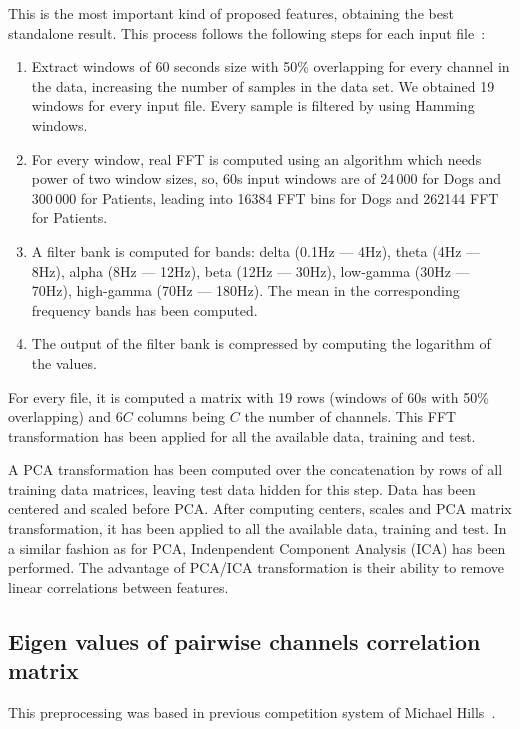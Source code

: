 \documentclass[a4paper,english,twoside]{article}
\begin{document}
This is the most important kind of proposed features, obtaining the best
standalone result. This process follows the following steps for each input
file~\cite{2014:howbert:plosone}:

\begin{enumerate}
\item
  Extract windows of 60 seconds size with 50\% overlapping for every
  channel in the data, increasing the number of samples in the data set.
  We obtained 19 windows for every input file. Every sample is filtered
  by using Hamming windows.
\item
  For every window, real FFT is computed using an algorithm which needs
  power of two window sizes, so, 60s input windows are of 24\,000 for Dogs
  and 300\,000 for Patients, leading into 16384 FFT bins for Dogs and
  262144 FFT for Patients.
\item A filter bank is computed for bands: delta (0.1Hz --- 4Hz), theta (4Hz ---
  8Hz), alpha (8Hz --- 12Hz), beta (12Hz --- 30Hz), low-gamma (30Hz --- 70Hz),
  high-gamma (70Hz --- 180Hz). The mean in the corresponding frequency bands has
  been computed.
\item
  The output of the filter bank is compressed by computing the logarithm
  of the values.
\end{enumerate}

For every file, it is computed a matrix with 19 rows (windows of 60s with 50\%
overlapping) and $6C$ columns being $C$ the number of channels. This FFT
transformation has been applied for all the available data, training and test.

A PCA transformation has been computed over the concatenation by rows of all
training data matrices, leaving test data hidden for this step. Data has been
centered and scaled before PCA. After computing centers, scales and PCA matrix
transformation, it has been applied to all the available data, training and
test. In a similar fashion as for PCA, Indenpendent Component Analysis (ICA) has
been performed. The advantage of PCA/ICA transformation is their ability to
remove linear correlations between features.

\subsection{Eigen values of pairwise channels correlation
  matrix}\label{eigen-values-of-pairwise-channels-correlation-matrix}

This preprocessing was based in previous competition system of Michael Hills~\cite{michaelhills}.
\end{document}
